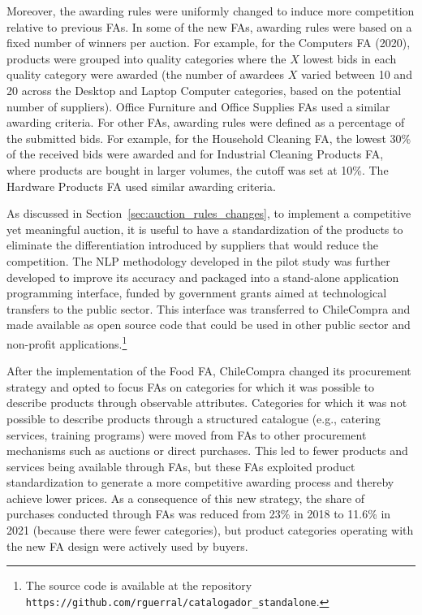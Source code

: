Moreover, the awarding rules were uniformly changed to induce more competition relative to previous FAs. 
In some of the new FAs, awarding rules were based on a fixed number of winners per auction. For example, for the Computers FA (2020), products were grouped into quality categories where the $X$ lowest bids in each quality category were awarded (the number of awardees $X$ varied between 10 and 20 across the Desktop and Laptop Computer categories, based on the potential number of suppliers). Office Furniture and Office Supplies FAs used a similar awarding criteria. For other FAs, awarding rules were defined as a percentage of the submitted bids. For example, for the Household Cleaning FA, the lowest 30\% of the received bids were awarded and  for Industrial Cleaning Products FA, where products  are bought in larger volumes, the cutoff was set at 10\%. The Hardware Products FA used similar awarding criteria.


 As discussed in Section~\ref{sec:auction_rules_changes}, to implement a competitive yet meaningful auction, it is useful to have a standardization of the products to eliminate the differentiation introduced by suppliers that would reduce the competition. The NLP methodology developed in the pilot study was further developed to improve its accuracy and packaged into a stand-alone application programming interface, funded by government grants aimed at technological transfers to the public sector. This interface was transferred to ChileCompra and made available as open source code that could be used in other public sector and non-profit applications.\footnote{The source code is available at the repository \texttt{https://github.com/rguerral/catalogador\_standalone}. }

After the implementation of the Food FA, ChileCompra changed its procurement strategy and opted to focus FAs on categories for which it was possible to describe products through observable attributes. Categories for which it was not possible to describe products through a structured catalogue (e.g., catering services, training programs) were moved from FAs to other procurement mechanisms such as auctions or direct purchases. {This led to fewer products and services being available through FAs, but these FAs exploited product standardization to generate a more competitive awarding process and thereby achieve lower prices. As a consequence of this new strategy, the share of purchases conducted through FAs was reduced from 23\% in 2018 to 11.6\% in 2021 (because there were fewer categories), but product categories operating with the new FA design were actively used by buyers.}

